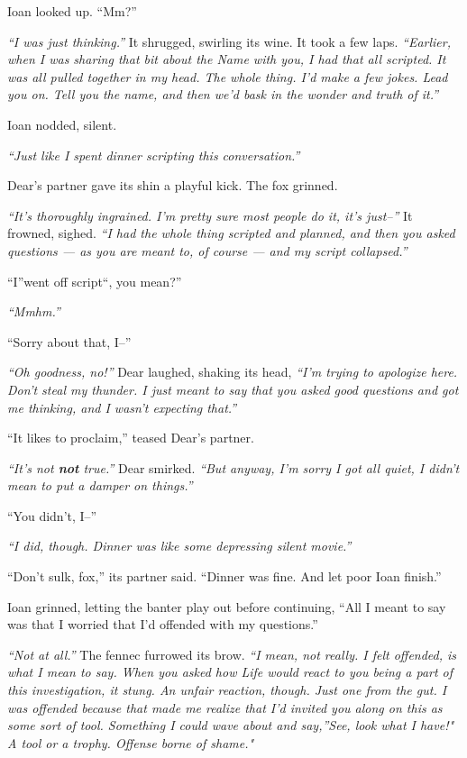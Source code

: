 Ioan looked up. ``Mm?''

\emph{``I was just thinking.''} It shrugged, swirling its wine. It took a few laps. \emph{``Earlier, when I was sharing that bit about the Name with you, I had that all scripted. It was all pulled together in my head. The whole thing. I'd make a few jokes. Lead you on. Tell you the name, and then we'd bask in the wonder and truth of it.''}

Ioan nodded, silent.

\emph{``Just like I spent dinner scripting this conversation.''}

Dear's partner gave its shin a playful kick. The fox grinned.

\emph{``It's thoroughly ingrained. I'm pretty sure most people do it, it's just--''} It frowned, sighed. \emph{``I had the whole thing scripted and planned, and then you asked questions — as you are meant to, of course — and my script collapsed.''}

``I''went off script``, you mean?''

\emph{``Mmhm.''}

``Sorry about that, I--''

\emph{``Oh goodness, no!''} Dear laughed, shaking its head, \emph{``I'm trying to apologize here. Don't steal my thunder. I just meant to say that you asked good questions and got me thinking, and I wasn't expecting that.''}

``It likes to proclaim,'' teased Dear's partner.

\emph{``It's not \textbf{not} true.''} Dear smirked. \emph{``But anyway, I'm sorry I got all quiet, I didn't mean to put a damper on things.''}

``You didn't, I--''

\emph{``I did, though. Dinner was like some depressing silent movie.''}

``Don't sulk, fox,'' its partner said. ``Dinner was fine. And let poor Ioan finish.''

Ioan grinned, letting the banter play out before continuing, ``All I meant to say was that I worried that I'd offended with my questions.''

\emph{``Not at all.''} The fennec furrowed its brow. \emph{``I mean, not really. I felt offended, is what I mean to say. When you asked how Life would react to you being a part of this investigation, it stung. An unfair reaction, though. Just one from the gut. I was offended because that made me realize that I'd invited you along on this as some sort of tool. Something I could wave about and say,''See, look what I have!" A tool or a trophy. Offense borne of shame."}


